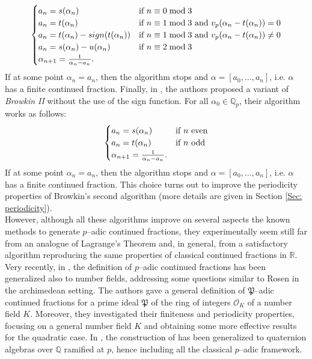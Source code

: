 \documentclass[12pt, reqno]{amsart}
\theoremstyle{plain}
\theoremstyle{definition}
\begin{document}
\begin{align}\label{Alg: Br3}\begin{cases}
a_n=s(\alpha_n) \ \ \ \ \ &\textup{if} \ n \equiv 0\bmod 3\\
a_n=t(\alpha_n) &\textup{if}  \ n \equiv 1 \bmod 3 \ \textup{and} \ v_p(\alpha_n-t(\alpha_n))= 0\\
a_n=t(\alpha_n)-sign(t(\alpha_n)) & \textup{if} \ n \equiv 1 \bmod 3 \ \textup{and} \  v_p(\alpha_n-t(\alpha_n))\neq0\\
a_n=s(\alpha_n)-u(\alpha_n)  & \textup{if} \ n \equiv 2 \bmod 3\\
\alpha_{n+1}=\frac{1}{\alpha_n-a_n}.
\end{cases}
\end{align}
If at some point $\alpha_n=a_n$, then the algorithm stops and $\alpha=[a_0,\ldots,a_n]$, i.e. $\alpha$ has a finite continued fraction. Finally, in \cite{MR}, the authors proposed a variant of \textit{Browkin II} without the use of the sign function. For all $\alpha_0\in\mathbb{Q}_p$, their algorithm works as follows:
\begin{align} 
\begin{cases}\label{Alg: new}
a_n=s(\alpha_n) \ \ \ \ \ & \textup{if} \ n \ \textup{even}\\
a_n=t(\alpha_n) & \textup{if} \ n \ \textup{odd}\\
\alpha_{n+1}=\frac{1}{\alpha_n-a_n}.
\end{cases}
\end{align}
If at some point $\alpha_n=a_n$, then the algorithm stops and $\alpha=[a_0,\ldots,a_n]$, i.e. $\alpha$ has a finite continued fraction. This choice turns out to improve the periodicity properties of Browkin's second algorithm (more details are given in Section \ref{Sec: periodicity}).\\

However, although all these algorithms improve on several aspects the known methods to generate $p$--adic continued fractions, they experimentally seem still far from an analogue of Lagrange's Theorem and, in general, from a satisfactory algorithm reproducing the same properties of classical continued fractions in $\mathbb{R}$.\\

Very recently, in \cite{CMT2}, the definition of $p$--adic continued fractions has been generalized also to number fields, addressing some questions similar to Rosen \cite{ROS1,ROS2} in the archimedean setting. The authors gave a general definition of $\mathfrak{P}$--adic continued fractions for a prime ideal $\mathfrak{P}$ of the ring of integers $\mathcal{O}_K$ of a number field $K$. Moreover, they investigated their finiteness and periodicity properties, focusing on a general number field $K$ and obtaining some more effective results for the quadratic case. In \cite{MULA}, the construction of \cite{CMT2} has been generalized to quaternion algebras over $\mathbb{Q}$ ramified at $p$, hence including all the classical $p$--adic framework.
\end{document}
